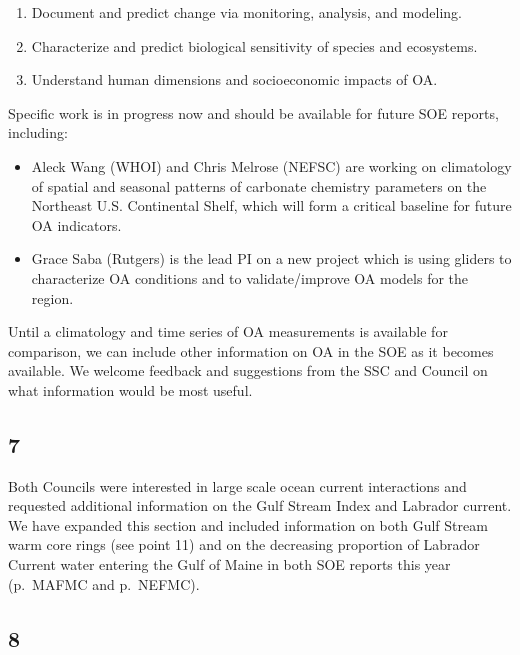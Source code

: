 \documentclass[
  10pt,
]{article}
\providecommand{\tightlist}{%
  \setlength{\itemsep}{0pt}\setlength{\parskip}{0pt}}
\begin{document}
\begin{enumerate}
\def\labelenumi{\arabic{enumi}.}
\tightlist
\item
  Document and predict change via monitoring, analysis, and modeling.\\
\item
  Characterize and predict biological sensitivity of species and
  ecosystems.\\
\item
  Understand human dimensions and socioeconomic impacts of OA.
\end{enumerate}

Specific work is in progress now and should be available for future SOE
reports, including:

\begin{itemize}
\tightlist
\item
  Aleck Wang (WHOI) and Chris Melrose (NEFSC) are working on climatology
  of spatial and seasonal patterns of carbonate chemistry parameters on
  the Northeast U.S. Continental Shelf, which will form a critical
  baseline for future OA indicators.
\item
  Grace Saba (Rutgers) is the lead PI on a new project which is using
  gliders to characterize OA conditions and to validate/improve OA
  models for the region.
\end{itemize}

Until a climatology and time series of OA measurements is available for
comparison, we can include other information on OA in the SOE as it
becomes available. We welcome feedback and suggestions from the SSC and
Council on what information would be most useful.

\hypertarget{section-6}{%
\subsection{7}\label{section-6}}

Both Councils were interested in large scale ocean current interactions
and requested additional information on the Gulf Stream Index and
Labrador current. We have expanded this section and included information
on both Gulf Stream warm core rings (see point 11) and on the decreasing
proportion of Labrador Current water entering the Gulf of Maine in both
SOE reports this year (p.~MAFMC and p.~NEFMC).

\hypertarget{section-7}{%
\subsection{8}\label{section-7}}
\end{document}
